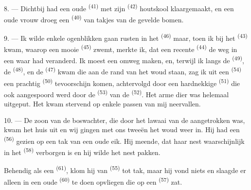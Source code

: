 8. --- Dichtbij had een oude  \textsuperscript{(41)} met zijn
 \textsuperscript{(42)} houtskool klaargemaakt, en een oude vrouw droeg
een  \textsuperscript{(40)}
 van takjes van de gevelde bomen.

\VUsaut{3.0mm}
\VUsaut{3.0mm}

9. --- Ik wilde enkele ogenblikken gaan rusten in het 
\textsuperscript{(46)} maar, toen ik bij het  \textsuperscript{(43)} kwam,
waarop een mooie  \textsuperscript{(45)} zwemt, merkte ik, dat een recente
 \textsuperscript{(44)} de weg in een waar 
had veranderd. Ik moest een omweg maken, en, terwijl ik langs de 
\textsuperscript{(49)}, de  \textsuperscript{(48)}, en de
 \textsuperscript{(47)} kwam die aan de rand van het woud staan, zag
ik uit een  \textsuperscript{(54)} een prachtig
 \textsuperscript{(50)} tevoorschijn komen, achtervolgd door een
hardnekkige  \textsuperscript{(51)} die ook aangespoord werd door de
 \textsuperscript{(53)} van de  \textsuperscript{(52)}.
Het arme dier was helemaal uitgeput. Het kwam stervend op enkele passen van mij neervallen.

10. --- De zoon van de boswachter, die door het lawaai van de  aangetrokken
was, kwam het huis uit en wij gingen met ons tweeën het woud weer in. Hij had een
 \textsuperscript{(56)} gezien op een tak van een oude eik. Hij meende, dat
haar nest waarschijnlijk in het  \textsuperscript{(58)} verborgen is en hij wilde
het nest pakken.

Behendig als een  \textsuperscript{(61)}, klom hij van
 \textsuperscript{(55)} tot tak, maar hij vond niets en slaagde er
alleen in een oude  \textsuperscript{(60)} te doen opvliegen die op een
 \textsuperscript{(57)} zat.
\VUsaut{4.0mm}
\VUfilet{22mm}
